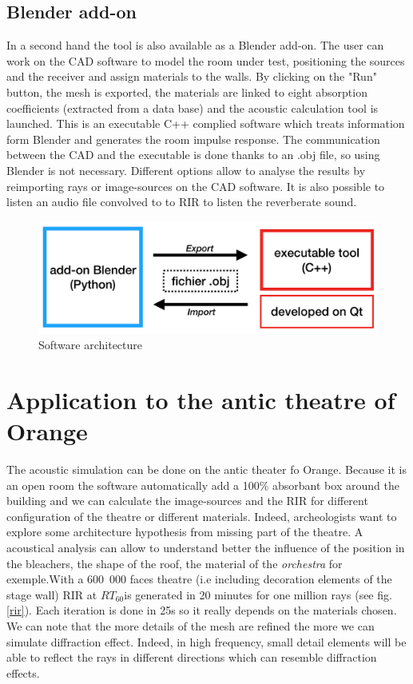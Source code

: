 \documentclass[AMA,STIX1COL]{WileyNJD-v2}
\begin{document}
\subsection{Blender add-on}
In a second hand the tool is also available as a Blender add-on. The user can work on the CAD software to model the room under test, positioning the sources and the receiver and assign materials to the walls. By clicking on the "Run" button, the mesh is exported, the materials are linked to eight absorption coefficients (extracted from a data base) and the acoustic calculation tool is launched. This is an executable C++ complied software which treats information form Blender and generates the room impulse response. The communication between the CAD and the executable is done thanks to an .obj file, so using Blender is not necessary. Different options allow to analyse the results by reimporting rays or image-sources on the CAD software. It is also possible to listen an audio file convolved to to RIR to listen the reverberate sound.



\begin{figure}
\centering
	\includegraphics[width=0.7\linewidth]{software}
	\caption{Software architecture}
\end{figure}



\section{Application to the antic theatre of Orange}\label{sec7}

The acoustic simulation can be done on the antic theater fo Orange. Because it is an open room the software automatically add a 100\% absorbant box around the building and we can calculate the image-sources and the RIR for different configuration of the theatre or different materials. Indeed, archeologists want to explore some architecture hypothesis from missing part of the theatre. A acoustical analysis can allow to understand better the influence of the position in the bleachers, the shape of the roof, the material of the \textit{orchestra} for exemple.With a 600~000 faces theatre (i.e including decoration elements of the stage wall) RIR at $RT_{60} $is generated in 20 minutes for one million rays (see fig. \ref{rir}). Each iteration is done in 25s so it really depends on the materials chosen. We can note that the more details of the mesh are refined the more we can simulate diffraction effect. Indeed, in high frequency, small detail elements will be able to reflect the rays in different directions which can resemble diffraction effects.
\end{document}
